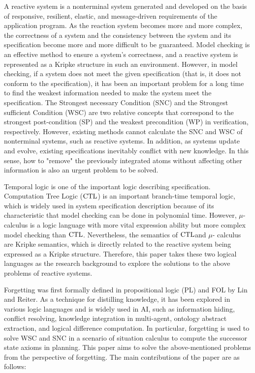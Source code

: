 \begin{englishabstract}
A reactive system is a nonterminal system generated and developed on the basis of responsive, resilient, elastic, and message-driven requirements of the application program.  As the reaction system becomes more and more complex, the correctness of a system and the consistency between the system and its specification become more and more difficult to be guaranteed. 	
Model checking is an effective method to ensure a system's correctness, and a reactive system is represented as a Kripke structure in such an environment.  However, in model checking, if a system does not meet the given specification (that is, it does not conform to the specification), it has been an important problem for a long time to find the weakest information needed to make the system meet the specification. 
The Strongest necessary Condition (SNC) and the Strongest sufficient Condition (WSC)  are two relative concepts that correspond to the strongest post-condition (SP) and the weakest precondition (WP) in verification, respectively. However, existing methods cannot calculate the SNC and WSC of nonterminal systems, such as reactive systems. 
In addition, as systems update and evolve, existing specifications inevitably conflict with new knowledge. In this sense, how to "remove" the previously integrated atoms without affecting other information is also an urgent problem to be solved. 
	
	
Temporal logic is one of the important logic describing specification.  Computation Tree Logic ($\textrm{CTL}$) is an important branch-time temporal logic, which is widely used in system specification description because of its characteristic that model checking can be done in polynomial time.  However, $\mu$-calculus is a logic language with more vital expression ability but more complex model checking than $\textrm{CTL}$. 
Nevertheless, the semantics of $\textrm{CTL}$and $\mu$- calculus are Kripke semantics, which is directly related to the reactive system being expressed as a Kripke structure. 
Therefore, this paper takes these two logical languages as the research background to explore the solutions to the above problems of reactive systems. 


Forgetting was first formally defined in propositional logic (PL) and FOL by Lin and Reiter. As a technique for distilling knowledge, it has been explored in various logic languages and is widely used in AI, such as information hiding, conflict resolving, knowledge integration in multi-agent, ontology abstract extraction, and logical difference computation. In particular, forgetting is used to solve WSC and SNC in a scenario of situation calculus to compute the successor state axioms in planning. This paper aims to solve the above-mentioned problems from the perspective of forgetting. The main contributions of the paper are as follows: 



\end{englishabstract}
